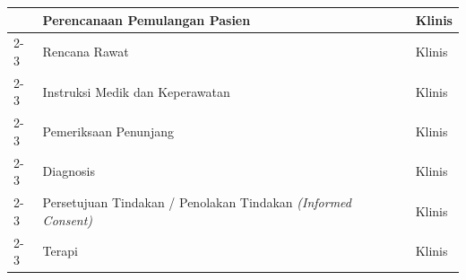 \begin{longtable}{|p{4cm}|p{5.2cm}|p{3.2cm}|}
	                              & Perencanaan Pemulangan Pasien
	                              & Klinis                                                                \\ \cline{2-3}

	                              & Rencana Rawat
	                              & Klinis                                                                \\ \cline{2-3}

	                              & Instruksi Medik dan Keperawatan
	                              & Klinis                                                                \\ \cline{2-3}

	                              & Pemeriksaan Penunjang
	                              & Klinis                                                                \\ \cline{2-3}



	                              & Diagnosis
	                              & Klinis                                                                \\ \cline{2-3}

	                              & Persetujuan Tindakan / Penolakan Tindakan \textit{(Informed Consent)}
	                              & Klinis                                                                \\ \cline{2-3}

	                              & Terapi
	                              & Klinis                                                                \\ \hline
\end{longtable}

